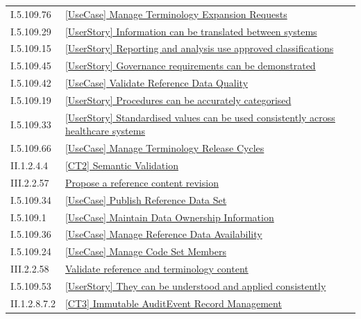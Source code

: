 \begin{longtable}{p{.22\linewidth}p{.73\linewidth}}
I.5.109.76 & \hyperref[element:4c465a265f6b4b19ba31b717de3c93fb]{[UseCase] Manage Terminology Expansion Requests} \\
I.5.109.29 & \hyperref[element:4fe3504e6f724e63ae75faf6e168fde1]{[UserStory] Information can be translated between systems} \\
I.5.109.15 & \hyperref[element:52b7ff98bbe54e318ef0a0fa5f4d309c]{[UserStory] Reporting and analysis use approved classifications} \\
I.5.109.45 & \hyperref[element:532a0886cf184aefbe8e27425fba0ef2]{[UserStory] Governance requirements can be demonstrated} \\
I.5.109.42 & \hyperref[element:5397e35131e841b88596d066868891d0]{[UseCase] Validate Reference Data Quality} \\
I.5.109.19 & \hyperref[element:558140ca8bc9490996c7f7ecc942540f]{[UserStory] Procedures can be accurately categorised} \\
I.5.109.33 & \hyperref[element:586a3981063b46938173df61581d90fe]{[UserStory] Standardised values can be used consistently across healthcare systems} \\
I.5.109.66 & \hyperref[element:5a9d9e5bbc054632836d41a36b6a8bac]{[UseCase] Manage Terminology Release Cycles} \\
II.1.2.4.4 & \hyperref[element:5dfb80f15eff4ec8bbb60016d36a5cd1]{[CT2] Semantic Validation} \\
III.2.2.57 & \hyperref[element:60f86772914349b086fec14a06ebf30b]{Propose a reference content revision} \\
I.5.109.34 & \hyperref[element:610db0f13aab4619a6ebba0f46a6db46]{[UseCase] Publish Reference Data Set} \\
I.5.109.1 & \hyperref[element:62466ac7a5bf4f9ca5d2bc349ff4ab57]{[UseCase] Maintain Data Ownership Information} \\
I.5.109.36 & \hyperref[element:66142b487f724c428885979fed06469a]{[UseCase] Manage Reference Data Availability} \\
I.5.109.24 & \hyperref[element:6c7bf11c70b246d38dc770aac43b826a]{[UseCase] Manage Code Set Members} \\
III.2.2.58 & \hyperref[element:6e6c29788acd49ab87f918476d7a3de0]{Validate reference and terminology content} \\
I.5.109.53 & \hyperref[element:707c02b323714f5f9b469de6b75c7ce4]{[UserStory] They can be understood and applied consistently} \\
II.1.2.8.7.2 & \hyperref[element:70e9f760ebd34045b8dd92f31fb8a00b]{[CT3] Immutable AuditEvent Record Management} \\

\end{longtable}
